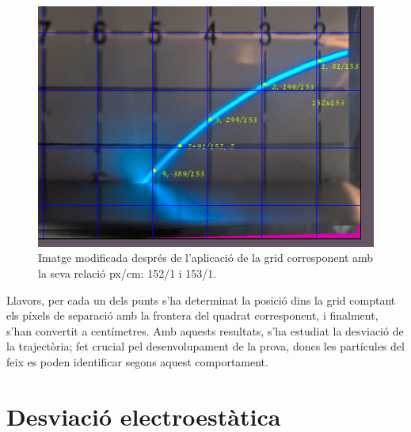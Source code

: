\documentclass[11pt]{article}
\begin{document}
\begin{figure}[H]
    \centering
    \includegraphics[scale=0.3]{Ex_grid.png}
    \caption{Imatge modificada després de l'aplicació de la grid corresponent amb la seva relació px/cm: 152/1 i 153/1.}
    \label{fig: ex_grid}
\end{figure}


Llavors, per cada un dels punts s'ha determinat la posició dins la grid comptant els píxels de separació amb la frontera del quadrat corresponent, i finalment, s'han convertit a centímetres. Amb aquests resultats, s'ha estudiat la desviació de la trajectòria; fet crucial pel desenvolupament de la prova, doncs les partícules del feix es poden identificar segons aquest comportament.

\newpage

\section{Desviació electroestàtica}\label{sec: desv_electr}
\end{document}
